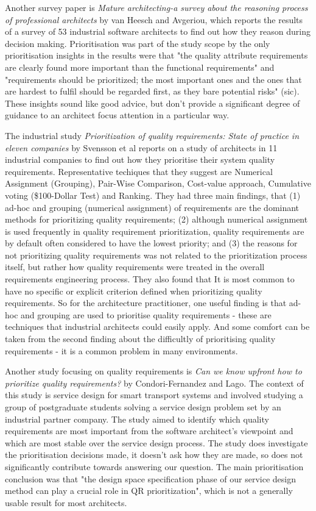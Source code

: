 Another survey paper is \emph{Mature architecting-a survey about the reasoning process of professional architects} \cite{vanheesch2011-maturearch} by van Heesch and Avgeriou, which reports the results of a survey of 53 industrial software architects to find out how they reason during decision making.  Prioritisation was part of the study scope by the only prioritisation insights in the results were   
that "the quality attribute requirements are clearly found more important than the functional requirements" and "requirements should be prioritized; the most important ones and the ones that are hardest to fulfil should be regarded first, as they bare potential risks" (sic).  These insights sound like good advice, but don't provide a significant degree of guidance to an architect focus attention in a particular way.

The industrial study \emph{Prioritization of quality requirements: State of practice in eleven companies} \cite{svensson2011-qrprioritisation} by Svensson et al reports on a study of architects in 11 industrial companies to find out how they prioritise their system quality requirements.  Representative techiques that they suggest are Numerical Assignment (Grouping), Pair-Wise Comparison, Cost-value approach, Cumulative voting (\$100-Dollar Test) and Ranking.  They had three main findings, that (1) ad-hoc and grouping (numerical assignment) of requirements are the dominant methods for prioritizing quality requirements; (2) although numerical assignment is used frequently in quality requirement prioritization, quality requirements are by default often considered to have the lowest priority; and (3) the reasons for not prioritizing quality requirements was not related to the prioritization process itself, but rather how quality requirements were treated in the overall requirements engineering process.  They also found that It is most common to have no specific or explicit criterion defined when prioritizing quality requirements.  So for the architecture practitioner, one useful finding is that ad-hoc and grouping are used to prioritise quality requirements - these are techniques that industrial architects could easily apply.  And some comfort can be taken from the second finding about the difficultly of prioritising quality requirements - it is a common problem in many environments.

Another study focusing on quality requirements is \emph{Can we know upfront how to prioritize quality requirements?} \cite{fernandez2015-qrprioritisation} by Condori-Fernandez and Lago.  The context of this study is service design for smart transport systems and involved studying a group of postgraduate students solving a service design problem set by an industrial partner company.  The study aimed to identify which quality requirements are most important from the software architect's viewpoint and which are most stable over the service design process.  The study does investigate the prioritisation decisions made, it doesn't ask how they are made, so does not significantly contribute towards answering our question.  The main prioritisation conclusion was that "the design space specification phase of our service design method can play a crucial role in QR prioritization", which is not a generally usable result for most architects.

